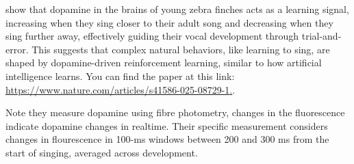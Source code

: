 \documentclass{article}\usepackage[]{graphicx}\usepackage[]{xcolor}
\begin{document}
\cite{Kasdin25} show that dopamine in the brains of young zebra finches acts as 
a learning signal, increasing when they sing closer to their adult song and 
decreasing when they sing further away, effectively guiding their vocal 
development through trial-and-error. This suggests that complex natural 
behaviors, like learning to sing, are shaped by dopamine-driven reinforcement 
learning, similar to how artificial intelligence learns. You can find the 
paper at this link:
\href{https://www.nature.com/articles/s41586-025-08729-1}{{https://www.nature.com/articles/s41586-025-08729-1}.}.




Note they measure dopamine using fibre photometry, changes in the fluorescence
indicate dopamine changes in realtime. Their specific measurement considers 
changes in flourescence in 100-ms windows between 200 and 300 ms from the start 
of singing, averaged across development.
\end{document}

